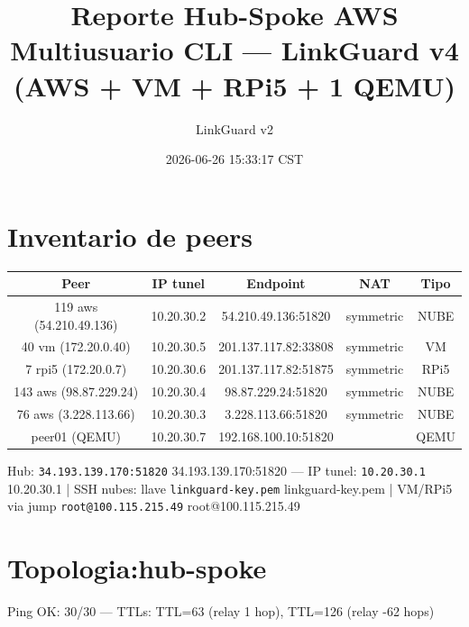 \documentclass[11pt,a4paper]{article}
\title{Reporte Hub-Spoke AWS Multiusuario CLI — LinkGuard v4 (AWS + VM + RPi5 + 1 QEMU)}
\author{LinkGuard v2}
\date{2026-06-26 15:33:17 CST}
\begin{document}
\maketitle

\section{Inventario de peers}
\begin{longtable}{|c|c|c|c|c|}
\hline
Peer & IP tunel & Endpoint & NAT & Tipo \\ \hline
119 aws (54.210.49.136) & 10.20.30.2 & 54.210.49.136:51820 & symmetric & NUBE \\ \hline
40 vm (172.20.0.40) & 10.20.30.5 & 201.137.117.82:33808 & symmetric & VM \\ \hline
7 rpi5 (172.20.0.7) & 10.20.30.6 & 201.137.117.82:51875 & symmetric & RPi5 \\ \hline
143 aws (98.87.229.24) & 10.20.30.4 & 98.87.229.24:51820 & symmetric & NUBE \\ \hline
76 aws (3.228.113.66) & 10.20.30.3 & 3.228.113.66:51820 & symmetric & NUBE \\ \hline
peer01 (QEMU) & 10.20.30.7 & 192.168.100.10:51820 &  & QEMU \\ \hline
\end{longtable}

Hub:  \texttt{34.193.139.170:51820} 34.193.139.170:51820  — IP tunel:  \texttt{10.20.30.1} 10.20.30.1  | SSH nubes: llave  \texttt{linkguard-key.pem} linkguard-key.pem  | VM/RPi5 via jump  \texttt{root@100.115.215.49} root@100.115.215.49\\

\section{Topologia:hub-spoke}
Ping OK: 30/30 — TTLs: TTL=63 (relay 1 hop), TTL=126 (relay -62 hops)\\
\end{document}
